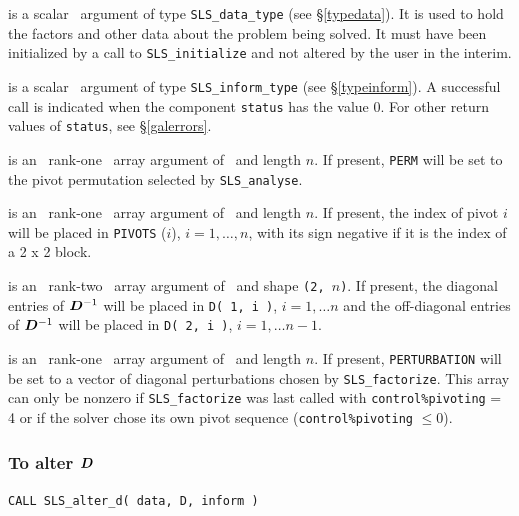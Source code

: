 \documentclass{galahad}
\newcommand{\packagename}{SLS}
\begin{document}
\begin{description}

 is a scalar \intentinout\ argument of type
{\tt \packagename\_data\_type}
(see \S\ref{typedata}). It is used to hold the factors and other
data about the problem being solved.
It must have been initialized by a call to
{\tt \packagename\_ini\-tialize} and not altered by the user in the interim.

 is a scalar \intentinout\ argument of type
{\tt \packagename\_inform\_type}
(see \S\ref{typeinform}).
A successful call is indicated when the  component {\tt status} has the value 0.
For other return values of {\tt status}, see \S\ref{galerrors}.

 is an \optional\ rank-one \integer\ array argument
of \intentout\ and length $n$.
If present, {\tt PERM} will be set to the pivot permutation
selected by {\tt \packagename\_analyse}.

 is an \optional\ rank-one \integer\ array argument
of \intentout\  and length $n$.
If present, the index of pivot $i$ will be placed in
{\tt PIVOTS} ($i$), $i = 1, \ldots, n$, with its sign negative if it is
the index of a 2 x 2 block.

 is an \optional\ rank-two \realdp\ array argument
of \intentout\, and shape {\tt (2, $n$)}.
If present, the diagonal entries of ${\bm{D}}^{-1} $ will
be placed in {\tt D( 1, i )}, $i = 1, \ldots n$ and the off-diagonal
entries of ${\bm{D}}^{-1} $ will be placed in {\tt D( 2, i )},
$i = 1, \ldots n-1$.

 is an \optional\ rank-one \realdp\ array argument
of \intentout\ and length $n$.
If present, {\tt PERTURBATION} will be set to a vector of diagonal perturbations
chosen by {\tt \packagename\_factorize}. This array can only be nonzero if
{\tt \packagename\_factorize} was last called with {\tt control\%pivoting} = 4
or if the solver chose its own pivot sequence ({\tt control\%pivoting} $\leq 0$).

\end{description}

\subsubsection{To alter ${\bm{D}}$}

\hskip0.5in
{\tt CALL \packagename\_alter\_d( data, D, inform )}
\end{document}
